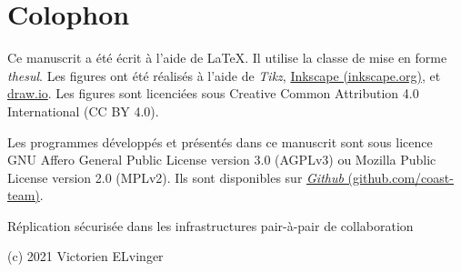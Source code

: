 \chapter*{Colophon}

Ce manuscrit a été écrit à l'aide de \LaTeX.
Il utilise la classe de mise en forme \emph{thesul}.
Les figures ont été réalisés à l'aide de \emph{Tikz}, \href{https://inkscape.org}{Inkscape (inkscape.org)}, et \href{https://draw.io}{draw.io}.
Les figures sont licenciées sous Creative Common Attribution 4.0 International (CC BY 4.0).

\bigskip

Les programmes développés et présentés dans ce manuscrit sont sous licence GNU Affero General Public License version 3.0 (AGPLv3) ou Mozilla Public License version 2.0 (MPLv2).
Ils sont disponibles sur \href{https://github.com/coast-team}{\emph{Github} (github.com/coast-team)}.

\begin{center}
Réplication sécurisée dans les infrastructures pair-à-pair de collaboration

\smallskip

(c) 2021 Victorien ELvinger
\end{center}
